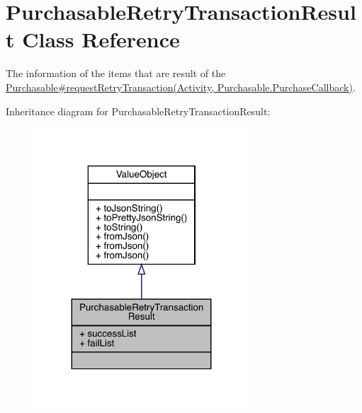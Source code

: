 \hypertarget{classcom_1_1toast_1_1android_1_1gamebase_1_1base_1_1purchase_1_1_purchasable_retry_transaction_result}{}\section{Purchasable\+Retry\+Transaction\+Result Class Reference}
\label{classcom_1_1toast_1_1android_1_1gamebase_1_1base_1_1purchase_1_1_purchasable_retry_transaction_result}


The information of the items that are result of the \hyperlink{}{Purchasable\#request\+Retry\+Transaction(\+Activity, Purchasable.\+Purchase\+Callback)}.  




Inheritance diagram for Purchasable\+Retry\+Transaction\+Result\+:
\nopagebreak
\begin{figure}[H]
\begin{center}
\leavevmode
\includegraphics[width=227pt]{classcom_1_1toast_1_1android_1_1gamebase_1_1base_1_1purchase_1_1_purchasable_retry_transaction_result__inherit__graph}
\end{center}
\end{figure}


